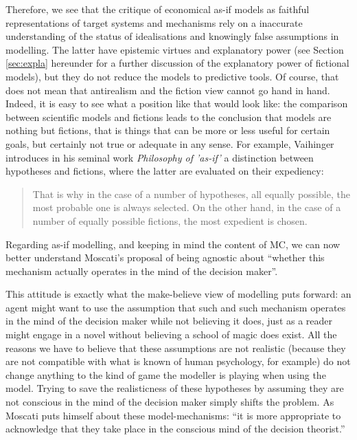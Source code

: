 \documentclass[a4paper,11pt]{article}
\theoremstyle{definition}
\begin{document}
Therefore, we see that the critique of economical as-if models as faithful representations of target systems and mechanisms rely on a inaccurate understanding of the status of idealisations and knowingly false assumptions in modelling. The latter have epistemic virtues and explanatory power (see Section \ref{sec:expla} hereunder for a further discussion of the explanatory power of fictional models), but they do not reduce the models to predictive tools. Of course, that does not mean that antirealism and the fiction view cannot go hand in hand. Indeed, it is easy to see what a position like that would look like: the comparison between scientific models and fictions leads to the conclusion that models are nothing but fictions, that is things that can be more or less useful for certain goals, but certainly not true or adequate in any sense. For example, Vaihinger introduces in his seminal work \textit{Philosophy of 'as-if'} a distinction between hypotheses and fictions, where the latter are evaluated on their expediency:

\begin{quote}
    That is why in the case of a number of hypotheses, all equally possible, the most probable one is always selected. On the other hand, in the case of a number of equally possible fictions, the most expedient is chosen. \citep[p.~85, note 1]{Vaihinger2009}
\end{quote}

Regarding as-if modelling, and keeping in mind the content of MC, we can now better understand Moscati's proposal of being agnostic about ``whether this mechanism actually operates in the mind of the decision maker''. \citep[p.~2]{Moscati2023}

This attitude is exactly what the make-believe view of modelling puts forward: an agent might want to use the assumption that such and such mechanism operates in the mind of the decision maker while not believing it does, just as a reader might engage in a novel without believing a school of magic does exist. All the reasons we have to believe that these assumptions are not realistic (because they are not compatible with what is known of human psychology, for example) do not change anything to the kind of game the modeller is playing when using the model. Trying to save the realisticness of these hypotheses by assuming they are not conscious in the mind of the decision maker simply shifts the problem. As Moscati puts himself about these model-mechanisms: ``it is more appropriate to acknowledge that they take place in the conscious mind of the decision theorist.'' \citep[p.~12]{Moscati2023}
\end{document}
